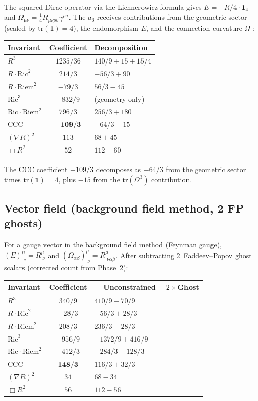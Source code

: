 \documentclass[11pt,a4paper]{article}
\begin{document}
The squared Dirac operator via the Lichnerowicz formula gives
$E=-R/4\cdot\mathbf{1}_4$ and
$\Omega_{\mu\nu}=\tfrac{1}{4}R_{\mu\nu\rho\sigma}\gamma^{\rho\sigma}$.
The $a_6$ receives contributions from the geometric sector (scaled by
$\mathrm{tr}(\mathbf{1})=4$), the endomorphism $E$, and the connection
curvature $\Omega$ \cite{Avramidi:2000,Bastianelli:2006}:

\begin{center}
\begin{tabular}{l c l}
\toprule
Invariant & Coefficient & Decomposition \\
\midrule
$R^3$ & $1235/36$ & $140/9 + 15 + 15/4$ \\
$R\cdot\mathrm{Ric}^2$ & $214/3$ & $-56/3 + 90$ \\
$R\cdot\mathrm{Riem}^2$ & $-79/3$ & $56/3 - 45$ \\
$\mathrm{Ric}^3$ & $-832/9$ & (geometry only) \\
$\mathrm{Ric}\cdot\mathrm{Riem}^2$ & $796/3$ & $256/3 + 180$ \\
CCC & $\mathbf{-109/3}$ & $-64/3 - 15$ \\
$(\nabla R)^2$ & $113$ & $68 + 45$ \\
$\Box R^2$ & $52$ & $112 - 60$ \\
\bottomrule
\end{tabular}
\end{center}

The CCC coefficient $-109/3$ decomposes as $-64/3$ from the geometric sector
times $\mathrm{tr}(\mathbf{1})=4$, plus $-15$ from the
$\mathrm{tr}(\Omega^3)$ contribution.

\subsection{Vector field (background field method, 2 FP ghosts)}

For a gauge vector in the background field method (Feynman gauge),
$(E)^\mu_{\;\nu}=R^\mu_{\;\nu}$ and
$(\Omega_{\alpha\beta})^\mu_{\;\nu}=R^\mu_{\;\nu\alpha\beta}$.
After subtracting 2~Faddeev--Popov ghost scalars
(corrected count from Phase~2):

\begin{center}
\begin{tabular}{l c l}
\toprule
Invariant & Coefficient & = Unconstrained $-\;2\times$Ghost \\
\midrule
$R^3$ & $340/9$ & $410/9 - 70/9$ \\
$R\cdot\mathrm{Ric}^2$ & $-28/3$ & $-56/3 + 28/3$ \\
$R\cdot\mathrm{Riem}^2$ & $208/3$ & $236/3 - 28/3$ \\
$\mathrm{Ric}^3$ & $-956/9$ & $-1372/9 + 416/9$ \\
$\mathrm{Ric}\cdot\mathrm{Riem}^2$ & $-412/3$ & $-284/3 - 128/3$ \\
CCC & $\mathbf{148/3}$ & $116/3 + 32/3$ \\
$(\nabla R)^2$ & $34$ & $68 - 34$ \\
$\Box R^2$ & $56$ & $112 - 56$ \\
\bottomrule
\end{tabular}
\end{center}
\end{document}
